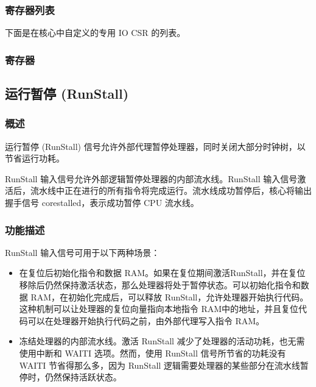\documentclass[main\_\_CN.tex]{subfiles}
\begin{document}
\newpage
\hypertarget{riscvcpu-fastio-reg-summ}{}
\subsubsection{寄存器列表}
\label{sec:riscvcpu-fastio-reg-summ}


下面是在核心中自定义的专用 IO CSR 的列表。




\subsubsection{寄存器}
\label{sec:riscvcpu-fastio-reg-desc}



\newpage
\subsection{运行暂停 (RunStall)}
\label{sec:riscvcpu-custom-runstall}
\subsubsection{概述}
\label{sec:riscvcpu-custom-runstall-overview}

运行暂停 (RunStall) 信号允许外部代理暂停处理器，同时关闭大部分时钟树，以节省运行功耗。

RunStall 输入信号允许外部逻辑暂停处理器的内部流水线。RunStall 输入信号激活后，流水线中正在进行的所有指令将完成运行。流水线成功暂停后，核心将输出握手信号 corestalled，表示成功暂停 CPU 流水线。

\subsubsection{功能描述}
\label{sec:riscvcpu-custom-runstall-feature-func-descr}

RunStall 输入信号可用于以下两种场景：
\begin{itemize}
    \item 在复位后初始化指令和数据 RAM。如果在复位期间激活RunStall，并在复位移除后仍然保持激活状态，那么处理器将处于暂停状态。可以初始化指令和数据 RAM，在初始化完成后，可以释放 RunStall，允许处理器开始执行代码。这种机制可以让处理器的复位向量指向本地指令 RAM中的地址，并且复位代码可以在处理器开始执行代码之前，由外部代理写入指令 RAM。
    \item 冻结处理器的内部流水线。激活 RunStall 减少了处理器的活动功耗，也无需使用中断和 WAITI 选项。然而，使用 RunStall 信号所节省的功耗没有 WAITI 节省得那么多，因为 RunStall 逻辑需要处理器的某些部分在流水线暂停时，仍然保持活跃状态。
\end{itemize}
\end{document}

